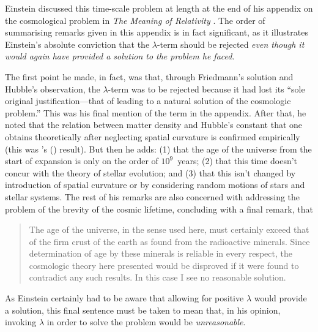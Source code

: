 \documentclass[12 pt]{article}
\def\citeapos#1{\citeauthor{#1}'s (\citeyear{#1})}
\begin{document}
Einstein discussed this time-scale problem at length at the end of his appendix on the cosmological problem in \textit{The Meaning of Relativity} \citep{Einstein1945}. The order of summarising remarks given in this appendix is in fact significant, as it illustrates Einstein's absolute conviction that the $\lambda$-term should be rejected \textit{even though it would again have provided a solution to the problem he faced}. 

The first point he made, in fact, was that, through Friedmann's solution and Hubble's observation, the $\lambda$-term was to be rejected because it had lost its ``sole original justification---that of leading to a natural solution of the cosmologic problem.'' This was his final mention of the term in the appendix. After that, he noted that the relation between matter density and Hubble's constant that one obtains theoretically after neglecting spatial curvature is confirmed empirically (this was \citeapos{Einstein1932} result). But then he adds: (1) that the age of the universe from the start of expansion is only on the order of $10^9$~years; (2) that this time doesn't concur with the theory of stellar evolution; and (3) that this isn't changed by introduction of spatial curvature or by considering random motions of stars and stellar systems. The rest of his remarks are also concerned with addressing the problem of the brevity of the cosmic lifetime, concluding with a final remark, that 
\begin{quote}
The age of the universe, in the sense used here, must certainly exceed that of the firm crust of the earth as found from the radioactive minerals. Since determination of age by these minerals is reliable in every respect, the cosmologic theory here presented would be disproved if it were found to contradict any such results. In this case I see no reasonable solution.
\end{quote}
As Einstein certainly had to be aware that allowing for positive $\lambda$ would provide a solution, this final sentence must be taken to mean that, in his opinion, invoking $\lambda$ in order to solve the problem would be \textit{unreasonable}.
\end{document}
